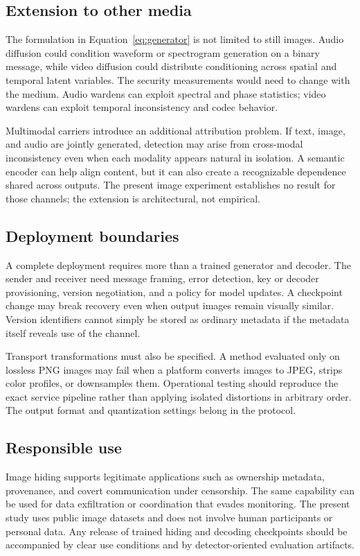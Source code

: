 \documentclass[pdflatex,sn-mathphys-num]{sn-jnl}
\begin{document}
\subsection{Extension to other media}

The formulation in Equation~\eqref{eq:generator} is not limited to still images. Audio diffusion could condition waveform or spectrogram generation on a binary message, while video diffusion could distribute conditioning across spatial and temporal latent variables. The security measurements would need to change with the medium. Audio wardens can exploit spectral and phase statistics; video wardens can exploit temporal inconsistency and codec behavior.

Multimodal carriers introduce an additional attribution problem. If text, image, and audio are jointly generated, detection may arise from cross-modal inconsistency even when each modality appears natural in isolation. A semantic encoder can help align content, but it can also create a recognizable dependence shared across outputs. The present image experiment establishes no result for those channels; the extension is architectural, not empirical.

\subsection{Deployment boundaries}

A complete deployment requires more than a trained generator and decoder. The sender and receiver need message framing, error detection, key or decoder provisioning, version negotiation, and a policy for model updates. A checkpoint change may break recovery even when output images remain visually similar. Version identifiers cannot simply be stored as ordinary metadata if the metadata itself reveals use of the channel.

Transport transformations must also be specified. A method evaluated only on lossless PNG images may fail when a platform converts images to JPEG, strips color profiles, or downsamples them. Operational testing should reproduce the exact service pipeline rather than applying isolated distortions in arbitrary order. The output format and quantization settings belong in the protocol.

\subsection{Responsible use}

Image hiding supports legitimate applications such as ownership metadata, provenance, and covert communication under censorship. The same capability can be used for data exfiltration or coordination that evades monitoring. The present study uses public image datasets and does not involve human participants or personal data. Any release of trained hiding and decoding checkpoints should be accompanied by clear use conditions and by detector-oriented evaluation artifacts.
\end{document}
